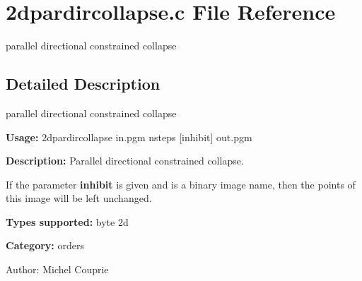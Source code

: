 \section{2dpardircollapse.c File Reference}
\label{2dpardircollapse_8c}
parallel directional constrained collapse  




\label{_details}
\subsection{Detailed Description}
parallel directional constrained collapse 

{\bf Usage:} 2dpardircollapse in.pgm nsteps [inhibit] out.pgm

{\bf Description:} Parallel directional constrained collapse.

If the parameter {\bf inhibit} is given and is a binary image name, then the points of this image will be left unchanged.

{\bf Types supported:} byte 2d

{\bf Category:} orders

\begin{Desc}
\item[Author:]Michel Couprie \end{Desc}
